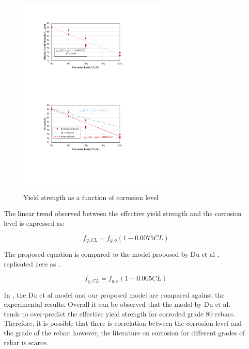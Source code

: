 \begin{figure}[htbp]
	\centering
	\includegraphics[width=0.7\textwidth]{VAC Thesis 2.0/Chapter-4/figs/TensionTest_results_2.pdf}
	\caption{Yield strength as a function of corrosion level}
	\label{fig:YieldStrength_vs_CL}
\end{figure}

The linear trend observed between the effective yield strength and the corrosion level is expressed as:

\begin{equation}
    f_{y,CL} = f_{y,o}(1-0.0075CL)
    \label{eq.Calderon_Fy_vs_CL}
\end{equation}

The proposed equation is compared to the model proposed by Du et al \cite{Du2005}, replicated here as . 

\begin{equation}
    f_{y,CL} = f_{y,o}(1-0.005CL)
\label{eq.Du_Fy_vs_CL_ch4}
\end{equation}

In , the Du et al model  and our proposed model  are compared against the experimental results. Overall it can be observed that the model by Du et al. \cite{Du2005} tends to over-predict the effective yield strength for corroded grade 80 rebars. Therefore, it is possible that there is correlation between the corrosion level and the grade of the rebar; however, the literature on corrosion for different grades of rebar is scarce. 

